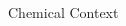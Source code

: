\documentclass{beamer}
\newcommand{\tss}{\textsuperscript}
\begin{document}
\begin{frame}{Chemical Context}
\begin{columns}
\begin{column}{0.5\textwidth}
    \end{column}
  \end{columns}  
\end{frame}
\end{document}
